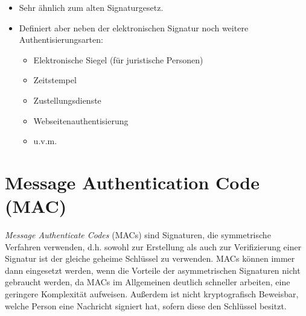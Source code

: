 \begin{itemize}
\begin{itemize}
	        		\item Sehr ähnlich zum alten Signaturgesetz.
	        		\item Definiert aber neben der elektronischen Signatur noch weitere Authentisierungsarten:
		        		\begin{itemize}
		        			\item Elektronische Siegel (für juristische Personen)
		        			\item Zeitstempel
		        			\item Zustellungsdienste
		        			\item Webseitenauthentisierung
		        			\item u.v.m.
		        		\end{itemize}
	        	\end{itemize}
        \end{itemize}

    \section{Message Authentication Code (MAC)}
        \textit{Message Authenticate Codes} (MACs) sind Signaturen, die symmetrische Verfahren verwenden, d.h. sowohl zur Erstellung als auch zur Verifizierung einer Signatur ist der gleiche geheime Schlüssel zu verwenden. MACs können immer dann eingesetzt werden, wenn die Vorteile der asymmetrischen Signaturen nicht gebraucht werden, da MACs im Allgemeinen deutlich schneller arbeiten, eine geringere Komplexität aufweisen. Außerdem ist nicht kryptografisch Beweisbar, welche Person eine Nachricht signiert hat, sofern diese den Schlüssel besitzt.

